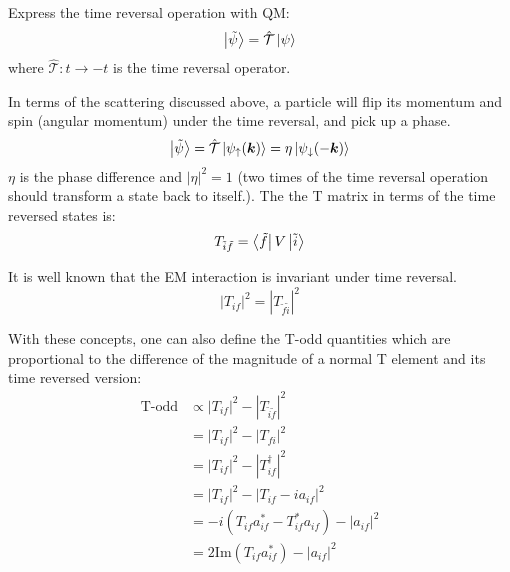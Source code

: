 Express the time reversal operation with QM:
\begin{equation}
    \ket{\tilde{\psi}} = \hat{\mathcal{T}} \ket{\psi} 
\end{equation}
where $\hat{\mathcal{T}}: t \rightarrow -t$ is the time reversal operator. 

In terms of the scattering discussed above, a particle will flip its momentum 
and spin (angular momentum) under the time reversal, and pick up a phase.
\begin{equation}
    \ket{\tilde{\psi}} = \hat{\mathcal{T}} \ket{\psi_\uparrow(\boldsymbol{k})} = \eta\ket{\psi_\downarrow(-\boldsymbol{k})}
\end{equation}
$\eta$ is the phase difference and $|\eta|^2 = 1$ (two times of the time reversal operation
should transform a state back to itself.). The the T matrix in terms of the 
time reversed states is:
\begin{equation}
    T_{\tilde{i}\tilde{f}} = \bra{\tilde{f}} V \ket{\tilde{i}}
\end{equation}

It is well known that the EM interaction is invariant under time reversal.
\begin{equation}
    |T_{if}|^2 = |T_{\tilde{f}\tilde{i}}|^2 
\end{equation}

With these concepts, one can also define the T-odd quantities which
are proportional to the difference of the magnitude of a normal T element and 
its time reversed version:
\begin{equation}
    \begin{aligned}
	\text{T-odd} &\propto |T_{if}|^2 - |T_{\tilde{i}\tilde{f}}|^2	\\
	    &= |T_{if}|^2 - |T_{fi}|^2	\\
	    &= |T_{if}|^2 - |T^\dag_{if}|^2	\\
	    &= |T_{if}|^2 - |T_{if} - ia_{if}|^2	\\
	    &= -i(T_{if}a^*_{if} - T^*_{if}a_{if}) - |a_{if}|^2	\\
	    &= 2\text{Im}(T_{if}a^*_{if}) - |a_{if}|^2
    \end{aligned}
    \label{eq:T-odd}
\end{equation}

